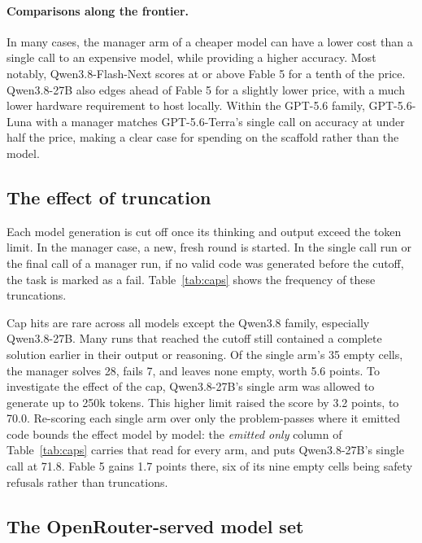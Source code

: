 \documentclass{article}
\begin{document}
\paragraph{Comparisons along the frontier.}
In many cases, the manager arm of a cheaper model can have a lower cost than a single call to an expensive model, while providing a higher accuracy. Most notably, Qwen3.8-Flash-Next scores at or above Fable 5 for a tenth of the price. Qwen3.8-27B also edges ahead of Fable 5 for a slightly lower price, with a much lower hardware requirement to host locally. Within the GPT-5.6 family, GPT-5.6-Luna with a manager matches GPT-5.6-Terra’s single call on accuracy at under half the price, making a clear case for spending on the scaffold rather than the model.

\FloatBarrier
\subsection{The effect of truncation}
\label{sec:truncation}

Each model generation is cut off once its thinking and output exceed the token limit. In the manager case, a new, fresh round is started. In the single call run or the final call of a manager run, if no valid code was generated before the cutoff, the task is marked as a fail. Table~\ref{tab:caps} shows the frequency of these truncations.




Cap hits are rare across all models except the Qwen3.8 family, especially Qwen3.8-27B. Many runs that reached the cutoff still contained a complete solution earlier in their output or reasoning.
Of the single arm's 35 empty cells, the manager
solves 28, fails 7, and leaves none empty, worth 5.6 points. To investigate the effect of the cap, Qwen3.8-27B's
single arm was allowed to generate up to 250k tokens. This higher limit raised the score by 3.2
points, to 70.0. Re-scoring each single arm over only the problem-passes
where it emitted code bounds the effect model by model: the \emph{emitted only} column of
Table~\ref{tab:caps} carries that read for every arm, and puts Qwen3.8-27B's single call at 71.8.
Fable 5
gains 1.7 points there, six of its nine empty cells being safety refusals rather than
truncations.

\subsection{The OpenRouter-served model set}
\label{sec:openrouter}
\end{document}
